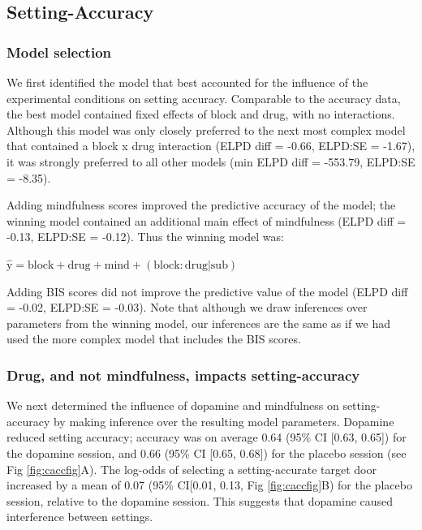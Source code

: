 \documentclass[
  man]{apa6}
\begin{document}
\hypertarget{setting-accuracy-1}{%
\subsection{Setting-Accuracy}\label{setting-accuracy-1}}

\label{sec:Setting-Accuracy Results}

\hypertarget{model-selection-1}{%
\subsubsection{Model selection}\label{model-selection-1}}

We first identified the model that best accounted for the influence of the experimental conditions on setting accuracy. Comparable to the accuracy data, the best model contained fixed effects of block and drug, with no interactions. Although this model was only closely preferred to the next most complex model that contained a block x drug interaction (ELPD diff = -0.66, ELPD:SE = -1.67), it was strongly preferred to all other models (min ELPD diff = -553.79, ELPD:SE = -8.35).

Adding mindfulness scores improved the predictive accuracy of the model; the winning model contained an additional main effect of mindfulness (ELPD diff = -0.13, ELPD:SE = -0.12). Thus the winning model was:

\(\mathrm{\hat{y}} = \mathrm{block} + \mathrm{drug} + \mathrm{mind} + \mathrm{(block:drug|sub)}\)

Adding BIS scores did not improve the predictive value of the model (ELPD diff = -0.02, ELPD:SE = -0.03). Note that although we draw inferences over parameters from the winning model, our inferences are the same as if we had used the more complex model that includes the BIS scores.

\hypertarget{drug-and-not-mindfulness-impacts-setting-accuracy}{%
\subsubsection{Drug, and not mindfulness, impacts setting-accuracy}\label{drug-and-not-mindfulness-impacts-setting-accuracy}}

We next determined the influence of dopamine and mindfulness on setting-accuracy by making inference over the resulting model parameters. Dopamine reduced setting accuracy; accuracy was on average 0.64 (95\% CI {[}0.63, 0.65{]}) for the dopamine session, and 0.66 (95\% CI {[}0.65, 0.68{]}) for the placebo session (see Fig \ref{fig:caccfig}A). The log-odds of selecting a setting-accurate target door increased by a mean of 0.07 (95\% CI{[}0.01, 0.13, Fig \ref{fig:caccfig}B) for the placebo session, relative to the dopamine session. This suggests that dopamine caused interference between settings.
\end{document}
